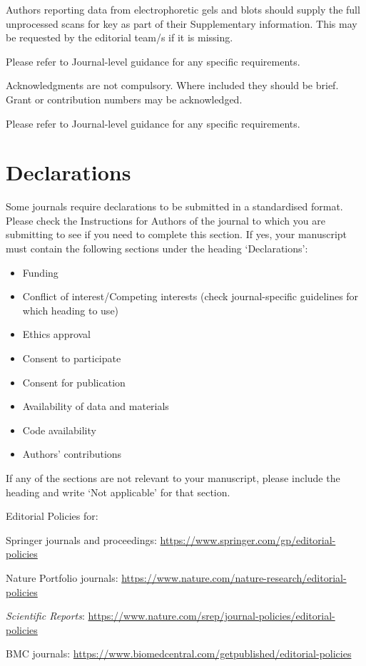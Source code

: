 \documentclass[pdflatex,sn-mathphys]{sn-jnl}%
\theoremstyle{thmstyleone}%
\theoremstyle{thmstyletwo}%
\theoremstyle{thmstylethree}%
\begin{document}
Authors reporting data from electrophoretic gels and blots should supply the full unprocessed scans for key as part of their Supplementary information. This may be requested by the editorial team/s if it is missing.

Please refer to Journal-level guidance for any specific requirements.


Acknowledgments are not compulsory. Where included they should be brief. Grant or contribution numbers may be acknowledged.

Please refer to Journal-level guidance for any specific requirements.

\section*{Declarations}

Some journals require declarations to be submitted in a standardised format. Please check the Instructions for Authors of the journal to which you are submitting to see if you need to complete this section. If yes, your manuscript must contain the following sections under the heading `Declarations':

\begin{itemize}
\item Funding
\item Conflict of interest/Competing interests (check journal-specific guidelines for which heading to use)
\item Ethics approval 
\item Consent to participate
\item Consent for publication
\item Availability of data and materials
\item Code availability 
\item Authors' contributions
\end{itemize}

\noindent
If any of the sections are not relevant to your manuscript, please include the heading and write `Not applicable' for that section. 

\bigskip
\begin{flushleft}%
Editorial Policies for:

\bigskip\noindent
Springer journals and proceedings: \url{https://www.springer.com/gp/editorial-policies}

\bigskip\noindent
Nature Portfolio journals: \url{https://www.nature.com/nature-research/editorial-policies}

\bigskip\noindent
\textit{Scientific Reports}: \url{https://www.nature.com/srep/journal-policies/editorial-policies}

\bigskip\noindent
BMC journals: \url{https://www.biomedcentral.com/getpublished/editorial-policies}
\end{flushleft}
\end{document}
